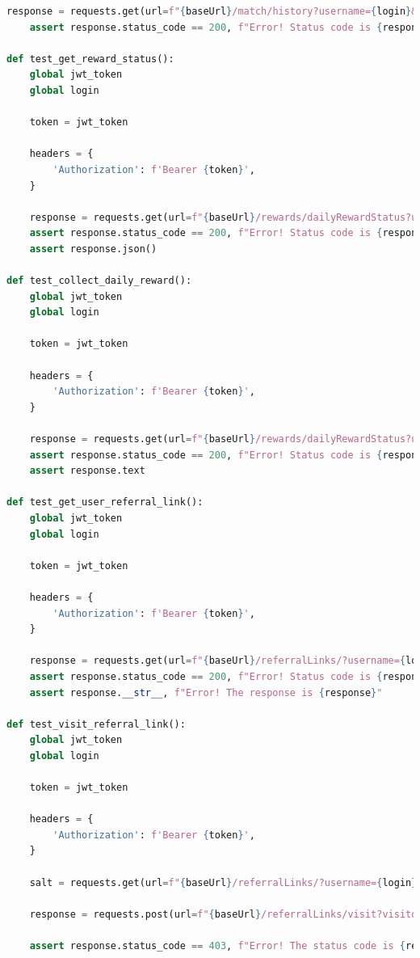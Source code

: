 \documentclass[a4paper, 12pt]{article}
\begin{document}
\begin{lstlisting}[language=python, caption={Код для тестирования API}]
    response = requests.get(url=f"{baseUrl}/match/history?username={login}&offset=0&limit=10", headers=headers)
    assert response.status_code == 200, f"Error! Status code is {response.status_code}"

def test_get_reward_status():
    global jwt_token
    global login

    token = jwt_token

    headers = {
        'Authorization': f'Bearer {token}',
    }    

    response = requests.get(url=f"{baseUrl}/rewards/dailyRewardStatus?username={login}", headers=headers)
    assert response.status_code == 200, f"Error! Status code is {response.status_code}"
    assert response.json()

def test_collect_daily_reward():
    global jwt_token
    global login

    token = jwt_token

    headers = {
        'Authorization': f'Bearer {token}',
    }    

    response = requests.get(url=f"{baseUrl}/rewards/dailyRewardStatus?username={login}", headers=headers)
    assert response.status_code == 200, f"Error! Status code is {response.status_code}"
    assert response.text

def test_get_user_referral_link():
    global jwt_token
    global login

    token = jwt_token

    headers = {
        'Authorization': f'Bearer {token}',
    }    

    response = requests.get(url=f"{baseUrl}/referralLinks/?username={login}", headers=headers)
    assert response.status_code == 200, f"Error! Status code is {response.status_code}"
    assert response.__str__, f"Error! The response is {response}"

def test_visit_referral_link():
    global jwt_token
    global login

    token = jwt_token

    headers = {
        'Authorization': f'Bearer {token}',
    }    

    salt = requests.get(url=f"{baseUrl}/referralLinks/?username={login}", headers=headers).__str__
    
    response = requests.post(url=f"{baseUrl}/referralLinks/visit?visitorName=hehe&referralSalt={salt}", headers=headers)

    assert response.status_code == 403, f"Error! The status code is {response.status_code}"


\end{lstlisting}
\end{document}
